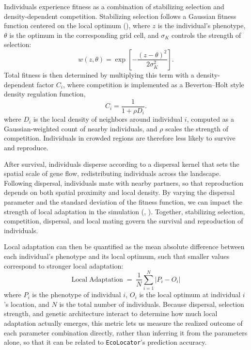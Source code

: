 \documentclass[]{article}
\newcommand{\ecolocator}{\texttt{EcoLocator}\xspace}
\begin{document}
Individuals experience fitness as a combination
of stabilizing selection and density-dependent competition.
Stabilizing selection follows a Gaussian fitness function
centered on the local optimum (),
where $z$ is the individual's phenotype,
$\theta$ is the optimum in the corresponding grid cell,
and $\sigma_K$ controls the strength of selection:
\begin{equation}
w(z, \theta) = \exp\!\left[-\frac{(z - \theta)^2}{2\sigma_K^2}\right].
\label{eq:stabsel}
\end{equation}
Total fitness is then determined by multiplying this term
with a density-dependent factor $C_i$,
where competition is implemented
as a Beverton--Holt style density regulation function,
\begin{equation}
C_i = \frac{1}{1 + \rho D_i}.
\label{eq:comp}
\end{equation}
where $D_i$ is the local density of neighbors 
around individual $i$, computed as a 
Gaussian-weighted count of nearby individuals, 
and $\rho$ scales the strength of competition. 
Individuals in crowded regions are therefore less 
likely to survive and reproduce.

After survival, individuals disperse
according to a dispersal kernel that 
sets the spatial scale of gene flow,
redistributing individuals across the landscape.
Following dispersal, individuals mate with nearby partners,
so that reproduction depends on both spatial proximity
and local density.
By varying the dispersal parameter
and the standard deviation of the fitness function,
we can impact the strength of local adaptation
in the simulation (, ).
Together, stabilizing selection, competition, dispersal,
and local mating govern the survival and reproduction of individuals.

Local adaptation can then be quantified
as the mean absolute difference between each individual's phenotype
and its local optimum,
such that smaller values correspond to stronger local adaptation:
\begin{equation}
\mathrm{Local\;Adaptation} \;=\;
\frac{1}{N} \sum_{i=1}^{N} \left| P_i - O_i \right|
\label{eq:localadapt}
\end{equation}
where $P_i$ is the phenotype of individual $i$, $O_i$ is the local optimum at 
individual $i$'s location, and $N$ is the total number of individuals.
Because dispersal, selection strength, and genetic architecture
interact to determine how much local adaptation actually emerges,
this metric lets us measure the realized outcome of each parameter 
combination directly, rather than inferring it from the parameters alone,
so that it can be related to \ecolocator's prediction accuracy. 
\end{document}
